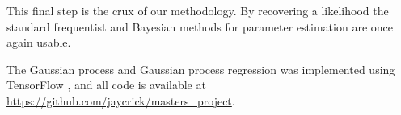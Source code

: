 This final step is the crux of our methodology. By recovering a likelihood
the standard frequentist and Bayesian methods for parameter estimation are 
once again usable.

The Gaussian process and Gaussian process regression was implemented using
TensorFlow \parencite{abadi_tensorflow_2015}, and all code
is available at \url{https://github.com/jaycrick/masters_project}.